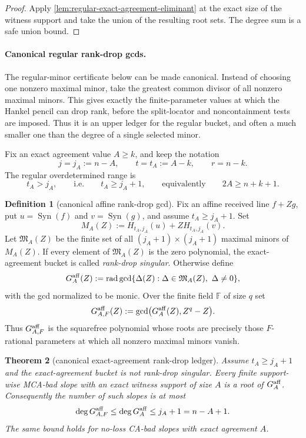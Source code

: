 \documentclass[11pt]{article}
\newtheorem{theorem}{Theorem}[section]
\theoremstyle{definition}
\newtheorem{definition}[theorem]{Definition}
\theoremstyle{remark}
\newcommand{\F}{\mathbb{F}}
\newcommand{\Syn}{\operatorname{Syn}}
\begin{document}
\begin{proof}
Apply \cref{lem:regular-exact-agreement-eliminant} at the exact size of the
witness support and take the union of the resulting root sets.  The degree sum is
a safe union bound.
\end{proof}

\paragraph{Canonical regular rank-drop gcds.}
The regular-minor certificate below can be made canonical.  Instead of choosing
one nonzero maximal minor, take the greatest common divisor of all nonzero
maximal minors.  This gives exactly the finite-parameter values at which the
Hankel pencil can drop rank, before the split-locator and noncontainment tests
are imposed.  Thus it is an upper ledger for the regular bucket, and often a much
smaller one than the degree of a single selected minor.

Fix an exact agreement value $A\ge k$, and keep the notation
\[
        j=j_A:=n-A,
        \qquad
        t=t_A:=A-k,
        \qquad
        r=n-k .
\]
The regular overdetermined range is
\[
        t_A>j_A,
        \qquad\text{i.e.}\qquad
        t_A\ge j_A+1,
        \qquad\text{equivalently}\qquad
        2A\ge n+k+1 .
\]

\begin{definition}[canonical affine rank-drop gcd]
\label{def:canonical-affine-rankdrop-gcd}
Fix an affine received line $f+Zg$, put
$u=\Syn(f)$ and $v=\Syn(g)$, and assume $t_A\ge j_A+1$.  Set
\[
        M_A(Z):=H_{t_A,j_A}(u)+Z H_{t_A,j_A}(v).
\]
Let $\mathfrak M_A(Z)$ be the finite set of all $(j_A+1)\times(j_A+1)$ maximal
minors of $M_A(Z)$.  If every element of $\mathfrak M_A(Z)$ is the zero
polynomial, the exact-agreement bucket is called \emph{rank-drop singular}.
Otherwise define
\[
        G_A^{\rm aff}(Z)
        :=\operatorname{rad}\gcd\{\Delta(Z):
              \Delta\in\mathfrak M_A(Z),\ \Delta\ne0\},
\]
with the gcd normalized to be monic.  Over the finite field $\F$ of size $q$ set
\[
        G_{A,F}^{\rm aff}(Z):=
        \gcd\bigl(G_A^{\rm aff}(Z),Z^q-Z\bigr).
\]
Thus $G_{A,F}^{\rm aff}$ is the squarefree polynomial whose roots are precisely
those $F$-rational parameters at which all nonzero maximal minors vanish.
\end{definition}

\begin{theorem}[canonical exact-agreement rank-drop ledger]
\label{thm:canonical-affine-rankdrop-ledger}
Assume $t_A\ge j_A+1$ and the exact-agreement bucket is not rank-drop singular.
Every finite support-wise MCA-bad slope with an exact witness support of size
$A$ is a root of $G_A^{\rm aff}$.  Consequently the number of such slopes is at
most
\[
        \deg G_{A,F}^{\rm aff}
        \le \deg G_A^{\rm aff}
        \le j_A+1=n-A+1 .
\]
The same bound holds for no-loss CA-bad slopes with exact agreement $A$.
\end{theorem}
\end{document}
